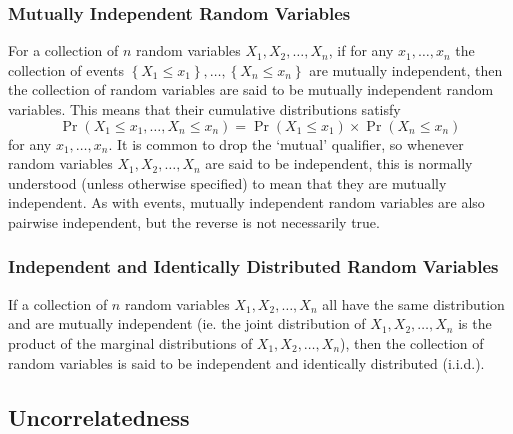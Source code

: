 \documentclass[11pt]{report} %
\begin{document}
\subsubsection{Mutually Independent Random Variables}

For a collection of $n$ random variables $X_{1}, X_{2}, \dots, X_{n}$, if for any $x_{1}, \dots, x_{n}$ the collection of events $\left\{X_{1} \leq x_{1}\right\}, \dots, \left\{X_{n} \leq x_{n}\right\}$ are mutually independent, then the collection of random variables are said to be mutually independent random variables. This means that their cumulative distributions satisfy
\begin{equation}
\operatorname{Pr}\left(X_{1} \leq x_{1}, \dots, X_{n} \leq x_{n}\right) = \operatorname{Pr}\left(X_{1} \leq x_{1}\right)\times\operatorname{Pr}\left(X_{n} \leq x_{n}\right)
\end{equation}
for any $x_{1}, \dots, x_{n}$. It is common to drop the `mutual' qualifier, so whenever random variables $X_{1}, X_{2}, \dots, X_{n}$ are said to be independent, this is normally understood (unless otherwise specified) to mean that they are mutually independent. As with events, mutually independent random variables are also pairwise independent, but the reverse is not necessarily true.

\subsubsection{Independent and Identically Distributed Random Variables}

If a collection of $n$ random variables $X_{1}, X_{2}, \dots, X_{n}$ all have the same distribution and are mutually independent (ie. the joint distribution of $X_{1}, X_{2}, \dots, X_{n}$ is the product of the marginal distributions of $X_{1}, X_{2}, \dots, X_{n}$), then the collection of random variables is said to be independent and identically distributed (i.i.d.).

\subsection{Uncorrelatedness}
\end{document}

